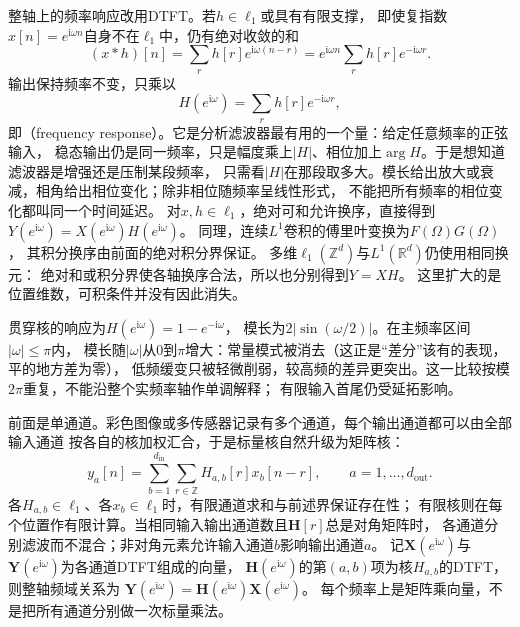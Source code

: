 整轴上的频率响应改用DTFT。若$h\in\ell_1$或具有有限支撑，
即使复指数$x[n]=e^{\mathrm i\omega n}$自身不在$\ell_1$中，仍有绝对收敛的和
\[
  (x*h)[n]=\sum_r h[r]e^{\mathrm i\omega(n-r)}
  =e^{\mathrm i\omega n}\sum_r h[r]e^{-\mathrm i\omega r}.
\]
输出保持频率不变，只乘以
\begin{equation}
  H(e^{\mathrm i\omega})=\sum_r h[r]e^{-\mathrm i\omega r},
  \label{eq:signal-analysis-filter-frequency-response}
\end{equation}
即（frequency response）。它是分析滤波器最有用的一个量：给定任意频率的正弦输入，
稳态输出仍是同一频率，只是幅度乘上$|H|$、相位加上$\arg H$。于是想知道滤波器是增强还是压制某段频率，
只需看$|H|$在那段取多大。模长给出放大或衰减，相角给出相位变化；除非相位随频率呈线性形式，
不能把所有频率的相位变化都叫同一个时间延迟。
对$x,h\in\ell_1$，绝对可和允许换序，直接得到
$Y(e^{\mathrm i\omega})=X(e^{\mathrm i\omega})H(e^{\mathrm i\omega})$。
同理，连续$L^1$卷积的傅里叶变换为$F(\Omega)G(\Omega)$，
其积分换序由前面的绝对积分界保证。
多维$\ell_1(\mathbb Z^d)$与$L^1(\mathbb R^d)$仍使用相同换元：
绝对和或积分界使各轴换序合法，所以也分别得到$Y=XH$。
这里扩大的是位置维数，可积条件并没有因此消失。

贯穿核的响应为$H(e^{\mathrm i\omega})=1-e^{-\mathrm i\omega}$，
模长为$2|\sin(\omega/2)|$。在主频率区间$|\omega|\leq\pi$内，
模长随$|\omega|$从$0$到$\pi$增大：常量模式被消去（这正是“差分”该有的表现，平的地方差为零），
低频缓变只被轻微削弱，较高频的差异更突出。这一比较按模$2\pi$重复，不能沿整个实频率轴作单调解释；
有限输入首尾仍受延拓影响。

前面是单通道。彩色图像或多传感器记录有多个通道，每个输出通道都可以由全部输入通道
按各自的核加权汇合，于是标量核自然升级为矩阵核：
\begin{equation}
  y_a[n]=\sum_{b=1}^{d_{\mathrm{in}}}\sum_{r\in\mathbb Z}
  H_{a,b}[r]x_b[n-r],
  \qquad a=1,\ldots,d_{\mathrm{out}}.
  \label{eq:signal-multichannel-convolution}
\end{equation}
各$H_{a,b}\in\ell_1$、各$x_b\in\ell_1$时，有限通道求和与前述界保证存在性；
有限核则在每个位置作有限计算。当相同输入输出通道数且$\bm H[r]$总是对角矩阵时，
各通道分别滤波而不混合；非对角元素允许输入通道$b$影响输出通道$a$。
记$\bm X(e^{\mathrm i\omega})$与$\bm Y(e^{\mathrm i\omega})$为各通道DTFT组成的向量，
$\bm H(e^{\mathrm i\omega})$的第$(a,b)$项为核$H_{a,b}$的DTFT，则整轴频域关系为
$\bm Y(e^{\mathrm i\omega})=\bm H(e^{\mathrm i\omega})\bm X(e^{\mathrm i\omega})$。
每个频率上是矩阵乘向量，不是把所有通道分别做一次标量乘法。

